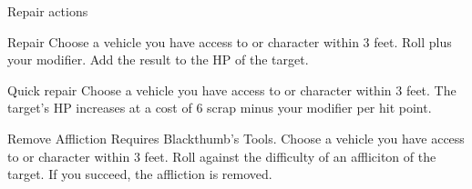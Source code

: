 \begin{abstractsection}{Repair actions}
\vspace{1ex}

\begin{describe}{Repair}
  Choose a vehicle you have access to or character within 3 feet. Roll  plus  your  modifier. Add the result to the HP of the target.
\end{describe}

\begin{describe}{Quick repair}
  Choose a vehicle you have access to or character within 3 feet. The target's HP increases at a cost of 6 scrap minus your  modifier per hit point.
\end{describe}

\begin{describe}{Remove Affliction}
  Requires Blackthumb's Tools. Choose a vehicle you have access to or character within 3 feet. Roll  against the difficulty of an affliciton of the target.  If you succeed, the affliction is removed.
\end{describe}
\end{abstractsection}
